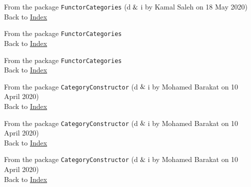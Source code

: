 
From the package \texttt{FunctorCategories} (d$\And$i by Kamal Saleh on 18 May 2020) \\
Back to \hyperref[lol]{Index}


From the package \texttt{FunctorCategories}\\
Back to \hyperref[lol]{Index}
		

From the package \texttt{FunctorCategories}\\
Back to \hyperref[lol]{Index}
		

From the package \texttt{CategoryConstructor} (d$\And$i by Mohamed Barakat on 10 April 2020) \\
Back to \hyperref[lol]{Index}
		

From the package \texttt{CategoryConstructor} (d$\And$i by Mohamed Barakat on 10 April 2020)\\
Back to \hyperref[lol]{Index}
		

From the package \texttt{CategoryConstructor} (d$\And$i by Mohamed Barakat on 10 April 2020)\\
Back to \hyperref[lol]{Index}

		
